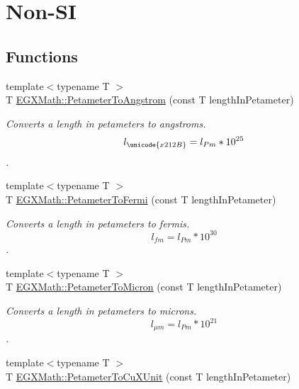 \hypertarget{group___e_g_x_math-_conversions-_length_conversions-_s_i-_petameter-_non-_s_i}{}\section{Non-\/\+SI}
\label{group___e_g_x_math-_conversions-_length_conversions-_s_i-_petameter-_non-_s_i}
\subsection*{Functions}
\begin{DoxyCompactItemize}
\item 
{\footnotesize template$<$typename T $>$ }\\T \mbox{\hyperlink{group___e_g_x_math-_conversions-_length_conversions-_s_i-_petameter-_non-_s_i_ga2acc301b8b78a80d23a150da8cba3814}{E\+G\+X\+Math\+::\+Petameter\+To\+Angstrom}} (const T length\+In\+Petameter)
\begin{DoxyCompactList}\small\item\em Converts a length in petameters to angstroms. \[ l_{\unicode{x212B}}=l_{Pm} * 10^{25} \]. \end{DoxyCompactList}\item 
{\footnotesize template$<$typename T $>$ }\\T \mbox{\hyperlink{group___e_g_x_math-_conversions-_length_conversions-_s_i-_petameter-_non-_s_i_gaba0fd76c76316722eb49006d032fa493}{E\+G\+X\+Math\+::\+Petameter\+To\+Fermi}} (const T length\+In\+Petameter)
\begin{DoxyCompactList}\small\item\em Converts a length in petameters to fermis. \[ l_{fm}=l_{Pm} * 10^{30} \]. \end{DoxyCompactList}\item 
{\footnotesize template$<$typename T $>$ }\\T \mbox{\hyperlink{group___e_g_x_math-_conversions-_length_conversions-_s_i-_petameter-_non-_s_i_gad1c1c26c232339c6304962d20cb29252}{E\+G\+X\+Math\+::\+Petameter\+To\+Micron}} (const T length\+In\+Petameter)
\begin{DoxyCompactList}\small\item\em Converts a length in petameters to microns. \[ l_{\mu m}=l_{Pm} * 10^{21} \]. \end{DoxyCompactList}\item 
{\footnotesize template$<$typename T $>$ }\\T \mbox{\hyperlink{group___e_g_x_math-_conversions-_length_conversions-_s_i-_petameter-_non-_s_i_gad9b37964189c5963e4c634122fd763fe}{E\+G\+X\+Math\+::\+Petameter\+To\+Cu\+X\+Unit}} (const T length\+In\+Petameter)

\end{DoxyCompactItemize}
